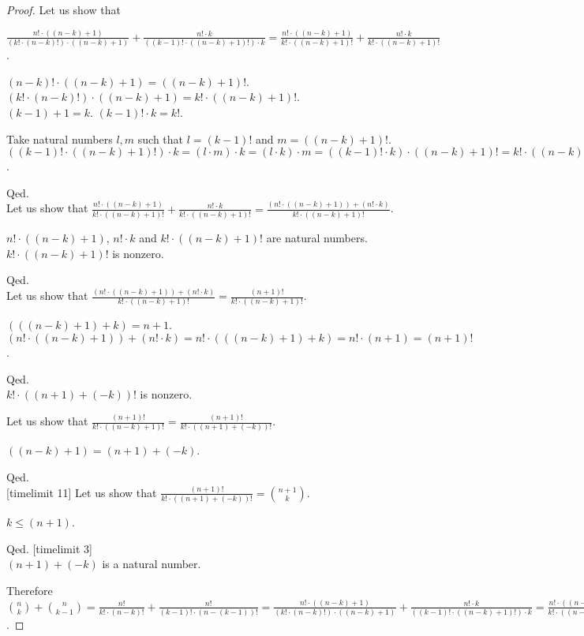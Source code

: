 \documentclass{article}
\begin{document}
\begin{forthel}
\begin{proof}
Let us show that 

$\frac{n! \cdot ((n-k)+1)}{(k! \cdot (n-k)!) \cdot ((n-k)+1) } + 
\frac{n! \cdot k}{((k-1)! \cdot ((n-k)+1)!) \cdot k} = 
\frac{n! \cdot ((n-k)+1)}{k! \cdot ((n-k)+1)! } + 
\frac{n! \cdot k}{k! \cdot ((n-k)+1)!}$.

$(n-k)! \cdot ((n-k)+1) = ((n-k)+1)!$. \\
$(k! \cdot (n-k)!) \cdot ((n-k)+1) = k! \cdot ((n-k)+1)!$. \\
$(k-1) + 1 = k$.
$(k-1)! \cdot k = k!$.

Take natural numbers $l,m$ such that $l = (k-1)!$ and $m = ((n-k)+1)!$.
$((k-1)! \cdot ((n-k)+1)!) \cdot k = 
(l \cdot m) \cdot k =
(l \cdot k) \cdot m =
((k-1)! \cdot k) \cdot ((n-k)+1)! = k! \cdot ((n-k)+1)!$.

Qed.
\\
  
Let us show that 
$\frac{n! \cdot ((n-k)+1)}{k! \cdot ((n-k)+1)! } + 
\frac{n! \cdot k}{k! \cdot ((n-k)+1)!} = 
\frac{(n! \cdot ((n-k)+1)) + (n! \cdot k)}{k! \cdot ((n-k)+1)!}$.

$n! \cdot ((n-k)+1)$, $n! \cdot k$ and $k! \cdot ((n-k)+1)!$ are natural numbers.
$k! \cdot ((n-k)+1)!$ is nonzero.

Qed.
\\

Let us show that
$ \frac{(n! \cdot ((n-k)+1)) + (n! \cdot k)}{k! \cdot ((n-k)+1)!}
= \frac{(n+1)!}{k! \cdot ((n-k)+1)!}$.

$(((n-k)+1)+k) = n+1$.
$(n! \cdot ((n-k)+1)) + (n! \cdot k) = n! \cdot (((n-k)+1)+k) =  n! \cdot (n+1) = (n+1)!$.

Qed.
\\

$k! \cdot ((n+1)+(-k))!$ is nonzero.

Let us show that $ \frac{(n+1)!}{k! \cdot ((n-k)+1)!}
= \frac{(n+1)!}{k! \cdot ((n+1)+(-k))!}$.

$((n-k)+1)=(n+1)+(-k)$.

Qed.
\\

[timelimit 11]
Let us show that $\frac{(n+1)!}{k! \cdot ((n+1)+(-k))!} = \binom{n+1}{k}$.

$k \leq (n+1)$.

Qed.
[timelimit 3]\\

$(n+1)+(-k)$ is a natural number.

Therefore 
$\binom{n}{k} + \binom{n}{k-1}
= \frac{n!}{k! \cdot (n-k)!} + \frac{n!}{(k-1)! \cdot (n-(k-1))!}
= \frac{n! \cdot ((n-k)+1)}{(k! \cdot (n-k)!) \cdot ((n-k)+1) } + 
\frac{n! \cdot k}{((k-1)! \cdot ((n-k)+1)!) \cdot k}
= \frac{n! \cdot ((n-k)+1)}{k! \cdot ((n-k)+1)! } + 
\frac{n! \cdot k}{k! \cdot ((n-k)+1)!}
= \frac{(n! \cdot ((n-k)+1)) + (n! \cdot k)}{k! \cdot ((n-k)+1)!}
= \frac{(n+1)!}{k! \cdot ((n-k)+1)!}
= \frac{(n+1)!}{k! \cdot ((n+1)+(-k))!}
= \binom{n+1}{k}$.
\end{proof}


\end{forthel}
\end{document}

